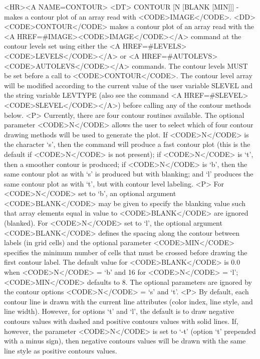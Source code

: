 \begin{rawhtml}
<HR><A NAME=CONTOUR>
<DT>
CONTOUR [N [BLANK [MIN]]] - makes a contour plot of an array read with <CODE>IMAGE</CODE>.
<DD>
	<CODE>CONTOUR</CODE> makes a contour plot of an array read with
	the <A HREF=#IMAGE><CODE>IMAGE</CODE></A> command at the
	contour levels set using either the
	<A HREF=#LEVELS><CODE>LEVELS</CODE></A> or
	<A HREF=#AUTOLEVS><CODE>AUTOLEVS</CODE></A> commands.  The contour
	levels MUST be set before a call to <CODE>CONTOUR</CODE>.  The
	contour level array will be modified according to the current
	value of the user variable SLEVEL and the string variable
	LEVTYPE (also see the command <A HREF=#SLEVEL><CODE>SLEVEL</CODE></A>)
	before calling any of the contour methods below.
	<P>
	Currently, there are four contour routines available.  The
	optional parameter <CODE>N</CODE> allows the user to select
	which of four contour drawing methods will be used to generate
	the plot.  If <CODE>N</CODE> is the character `s', then the
	command will produce a fast contour plot (this is the default
	if <CODE>N</CODE> is not present); if <CODE>N</CODE> is `t',
	then a smoother contour is produced; if <CODE>N</CODE> is `b',
	then the same contour plot as with `s' is produced but with
	blanking; and `l' produces the same contour plot as with `t',
	but with contour level labeling.
	<P>
	For <CODE>N</CODE> set to `b', an optional argument
	<CODE>BLANK</CODE> may be given to specify the blanking value
	such that array elements equal in value to <CODE>BLANK</CODE>
	are ignored (blanked).  For <CODE>N</CODE> set to `l', the
	optional argument <CODE>BLANK</CODE> defines the spacing along
	the contour between labels (in grid cells) and the optional
	parameter <CODE>MIN</CODE> specifies the minimum number of
	cells that must be crossed before drawing the first contour
	label.  The default value for <CODE>BLANK</CODE> is 0.0 when
	<CODE>N</CODE> = `b' and 16 for <CODE>N</CODE> = `l';
	<CODE>MIN</CODE> defaults to 8.  The optional parameters are
	ignored by the contour options <CODE>N</CODE> = `s' and `t'.
	<P>
	By default, each contour line is drawn with the current line
	attributes (color index, line style, and line width).  However,
	for options `t' and `l', the default is to draw negative contours
	values with dashed and positive contours values with solid lines.
	If, however, the parameter <CODE>N</CODE> is set to `-t'
	(option `t' prepended with a minus sign), then negative contours
	values will be drawn with the same line style as positive
	contours values.


\end{rawhtml}
